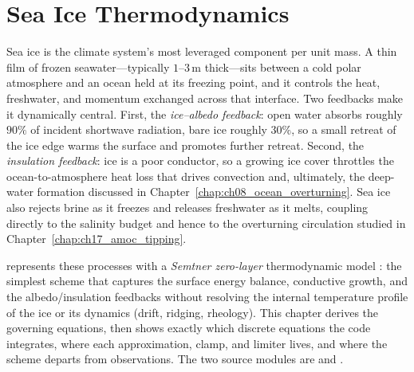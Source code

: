 \chapter{Sea Ice Thermodynamics}\label{chap:ch11_seaice}

\providecommand{\hice}{h}              %
\providecommand{\Aice}{A}              %
\providecommand{\Tsi}{T_{s}}          %
\providecommand{\Tfr}{T_{f}}           %
\providecommand{\Lf}{L_{f}}            %
\providecommand{\kice}{k_{i}}          %
\providecommand{\rhoice}{\rho_{i}}     %
\providecommand{\Fnet}{F_{\mathrm{net}}}

Sea ice is the climate system's most leveraged component per unit mass.
A thin film of frozen seawater---typically $1$--$3\,\mathrm{m}$ thick---sits
between a cold polar atmosphere and an ocean held at its freezing point, and it
controls the heat, freshwater, and momentum exchanged across that interface. Two
feedbacks make it dynamically central. First, the \emph{ice--albedo feedback}:
open water absorbs roughly $90\%$ of incident shortwave radiation, bare ice
roughly $30\%$, so a small retreat of the ice edge warms the surface and
promotes further retreat. Second, the \emph{insulation feedback}: ice is a poor
conductor, so a growing ice cover throttles the ocean-to-atmosphere heat loss
that drives convection and, ultimately, the deep-water formation discussed in
Chapter~\ref{chap:ch08_ocean_overturning}. Sea ice also rejects brine as it
freezes and releases freshwater as it melts, coupling directly to the salinity
budget and hence to the overturning circulation studied in
Chapter~\ref{chap:ch17_amoc_tipping}.

\model{} represents these processes with a \emph{Semtner zero-layer}
thermodynamic model \citep{semtner1976}: the simplest scheme that captures the
surface energy balance, conductive growth, and the albedo/insulation feedbacks
without resolving the internal temperature profile of the ice or its dynamics
(drift, ridging, rheology). This chapter derives the governing equations, then
shows exactly which discrete equations the code integrates, where each
approximation, clamp, and limiter lives, and where the scheme departs from
observations. The two source modules are
and .

